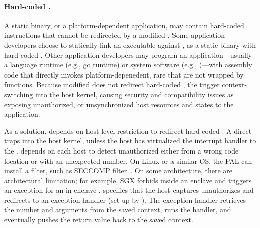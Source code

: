 \paragraph{Hard-coded \linuxapis{}.}
A static binary, or a platform-dependent application, may contain hard-coded  instructions
that cannot be redirected by a modified \libc{}.
Some application developers choose to statically link an executable against \libc{},
as a static binary with hard-coded \linuxapis{}. %
Other application developers may program an application---usually a language runtime (e.g., go runtime) or system software (e.g., )---with assembly code that directly invokes
platform-depenedent,
rare \linuxapis{} that are not wrapped by \libc{} functions.
Because modified \glibc{} does not redirect hard-coded \linuxapis{},
the \linuxapis{}
trigger context-switching into the host kernel,
causing security and compatibility issues as
exposing unauthorized, or unsynchronized host resources and states to the application.


As a solution,
\thelibos{} depends on host-level \linuxapi{} restriction to redirect hard-coded \linuxapis{}.
A direct \linuxapi{} traps into the host kernel,
unless the host has virtualized the interrupt handler to the \libos{}.
\graphene{} depends on each host to
detect unauthorized \linuxapis{} either from a wrong code location or with an unexpected \linuxapi{} number.
On Linux or a similar OS, the PAL can install a \linuxapi{} filter,
such as SECCOMP filter~\cite{seccomp}.
On some architecture, there are architectural limitation;
for example, SGX forbids \linuxapis{} inside an enclave and triggers an exception for an in-enclave \linuxapi{}.
\thehostabi{} specifies that the host captures unauthorizes \linuxapis{}
and redirects to an exception handler (set up by ).
The exception handler 
retrieves the \linuxapi{} number and arguments
from the saved context,
runs the \linuxapi{} handler,
and eventually pushes the return value back to the saved context. %


